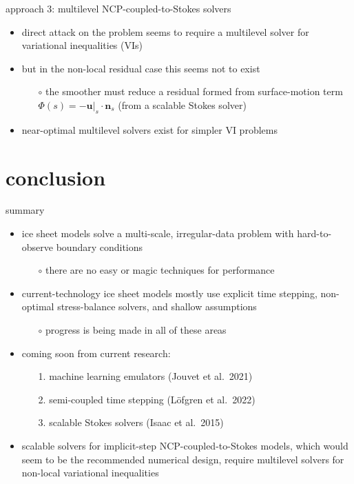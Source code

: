 \documentclass[svgnames,
               hyperref={colorlinks,citecolor=DeepPink4,linkcolor=FireBrick,urlcolor=Maroon},
               usepdftitle=false]  %
               {beamer}
\newcommand{\bn}{\mathbf{n}}
\newcommand{\bu}{\mathbf{u}}
\begin{document}
\begin{frame}{approach 3: multilevel NCP-coupled-to-Stokes solvers}

\begin{itemize}
\item direct attack on the problem seems to require a \alert{multilevel} solver for \alert{variational inequalities} (VIs)
\item but in the non-local residual case this seems not to exist
    \begin{itemize}
    \item[$\circ$] the \alert{smoother} must reduce a residual formed from surface-motion term $\Phi(s) = - \bu|_s\cdot \bn_s$ (from a scalable Stokes solver)
    \end{itemize}
\item near-optimal multilevel solvers exist for simpler VI problems
\end{itemize}
\end{frame}


\section{conclusion}

\begin{frame}{\alert{summary}}

\begin{itemize}
\item ice sheet models solve a multi-scale, irregular-data problem with hard-to-observe boundary conditions
   \begin{itemize}
   \item[$\circ$] there are \alert{no easy or magic techniques} for performance
   \end{itemize}
\item<2-> current-technology ice sheet models mostly use \alert{explicit} time stepping, \alert{non-optimal} stress-balance solvers, and \alert{shallow} assumptions
   \begin{itemize}
   \item[$\circ$] progress is being made in all of these areas
   \end{itemize}
\item<3-> \alert{coming soon} from current research:
   \begin{enumerate}
   \item[1.] machine learning emulators (Jouvet et al.~2021)
   \item[2.] semi-coupled time stepping (L{\"o}fgren et al.~2022)
   \item[3.] scalable Stokes solvers (Isaac et al.~2015)   
   \end{enumerate}
\item<4-> scalable solvers for implicit-step NCP-coupled-to-Stokes models, which would seem to be the recommended numerical design, require \alert{multilevel solvers for non-local variational inequalities}
\end{itemize}
\end{frame}
\end{document}
